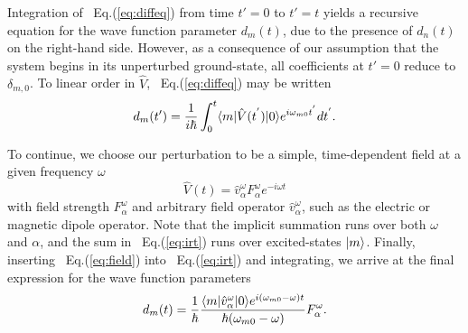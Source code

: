 {{{Integration of ~Eq.(\ref{eq:diffeq}) from time $t' = 0$ to $t' = t$ yields a recursive equation for the 
wave function parameter $d_m(t)$, due to the presence of $d_n(t)$ on the right-hand side. 
However, as a consequence of our assumption that the system begins in its unperturbed ground-state, all
coefficients at $t' = 0$ reduce to $\delta_{m,0}$. To linear order in $\hat{V}$, ~Eq.(\ref{eq:diffeq}) may be written
\begin{equation} \label{eq:irt}
    d_m(t') = \frac{1}{i\hbar}\int_0^t\langle m |\hat{V}(t^{'})| 0 \rangle e^{i\omega_{m0}t^{'}}dt^{'}.
\end{equation}

To continue, we choose our perturbation to be a simple, time-dependent field at a given frequency $\omega$ 
\begin{equation} \label{eq:field}
\hat{V}(t) = \hat{v}^\omega_\alpha F^\omega_\alpha e^{-i\omega t}
\end{equation}
with field strength $F^\omega_\alpha$ and arbitrary field operator $\hat{v}^\omega_\alpha$, such as the electric or magnetic dipole operator. 
Note that the implicit summation runs over both $\omega$ and $\alpha$, and the sum in ~Eq.(\ref{eq:irt}) runs over excited-states $| m \rangle$.
Finally, inserting ~Eq.(\ref{eq:field}) into ~Eq.(\ref{eq:irt}) and integrating, we arrive at the final expression for the
wave function parameters
\begin{equation} \label{eq:sot}
    \begin{aligned}
        d_m(t) = \frac{1}{\hbar}\frac{\langle m |\hat{v}^\omega_\alpha| 0 \rangle e^{i(\omega_{m0}-\omega)t}}{\hbar(\omega_{m0}-\omega)}F^{\omega}_{\alpha}.
    \end{aligned}
\end{equation}
 
}}}
